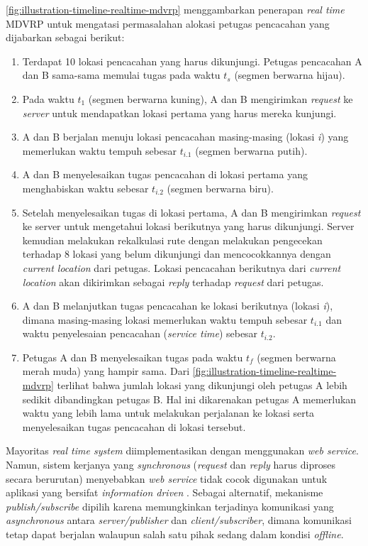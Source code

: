 \autoref{fig:illustration-timeline-realtime-mdvrp} menggambarkan penerapan \textit{real time} MDVRP untuk mengatasi permasalahan alokasi petugas pencacahan yang dijabarkan sebagai berikut:
\begin{enumerate}
	\item Terdapat 10 lokasi pencacahan yang harus dikunjungi. Petugas pencacahan A dan B sama-sama memulai tugas pada waktu $t_{s}$ (segmen berwarna hijau).
	\item Pada waktu $t_{1}$ (segmen berwarna kuning), A dan B mengirimkan \textit{request} ke \textit{server} untuk mendapatkan lokasi pertama yang harus mereka kunjungi. 
	\item A dan B berjalan menuju lokasi pencacahan masing-masing (lokasi \textit{i}) yang memerlukan waktu tempuh sebesar $t_{i.1}$ (segmen berwarna putih). 
	\item A dan B menyelesaikan tugas pencacahan di lokasi pertama yang menghabiskan waktu sebesar $t_{i.2}$ (segmen berwarna biru).
	\item Setelah menyelesaikan tugas di lokasi pertama, A dan B mengirimkan \textit{request} ke server untuk mengetahui lokasi berikutnya yang harus dikunjungi. Server kemudian melakukan rekalkulasi rute dengan melakukan pengecekan terhadap 8 lokasi yang belum dikunjungi dan mencocokkannya dengan \textit{current location} dari petugas. Lokasi pencacahan berikutnya dari \textit{current location} akan dikirimkan sebagai \textit{reply} terhadap \textit{request} dari petugas. 
	\item A dan B melanjutkan tugas pencacahan ke lokasi berikutnya (lokasi \textit{i}), dimana masing-masing lokasi memerlukan waktu tempuh sebesar $t_{i.1}$ dan waktu penyelesaian pencacahan (\textit{service time}) sebesar $t_{i.2}$.
	\item Petugas A dan B menyelesaikan tugas pada waktu $t_{f}$ (segmen berwarna merah muda) yang hampir sama. Dari \autoref{fig:illustration-timeline-realtime-mdvrp} terlihat bahwa jumlah lokasi yang dikunjungi oleh petugas A lebih sedikit dibandingkan petugas B. Hal ini dikarenakan petugas A memerlukan waktu yang lebih lama untuk melakukan perjalanan ke lokasi serta menyelesaikan tugas pencacahan di lokasi tersebut. 
\end{enumerate}


Mayoritas \textit{real time system} diimplementasikan dengan menggunakan \textit{web service}. Namun, sistem kerjanya yang \textit{synchronous} (\textit{request} dan \textit{reply} harus diproses secara berurutan) menyebabkan \textit{web service} tidak cocok digunakan untuk aplikasi yang bersifat \textit{information driven} \citep{muhl_large-scale_2002}. Sebagai alternatif, mekanisme \textit{publish/subscribe} dipilih karena memungkinkan terjadinya komunikasi yang \textit{asynchronous} antara \textit{server/publisher} dan \textit{client/subscriber}, dimana komunikasi tetap dapat berjalan walaupun salah satu pihak sedang dalam kondisi \textit{offline}.


